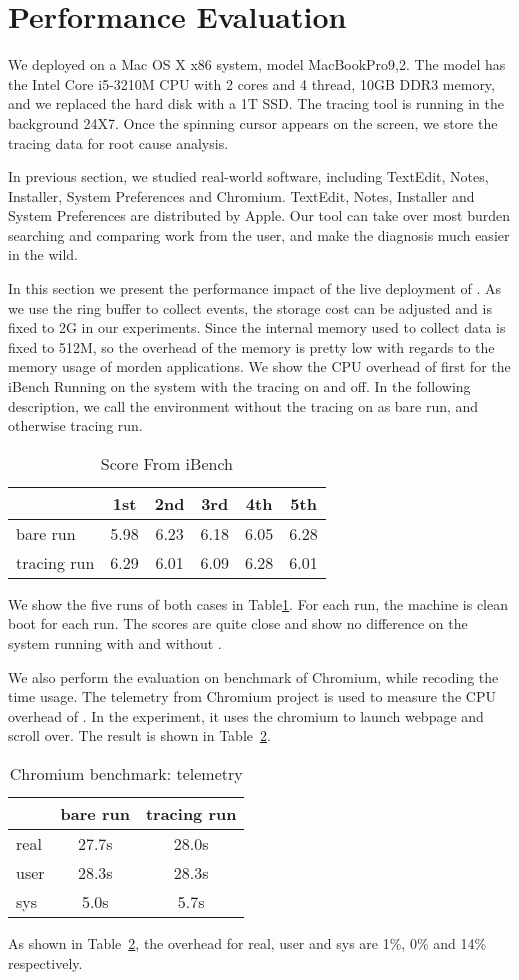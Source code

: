\section{Performance Evaluation}
\label{sec:evaluation}
We deployed \xxx on a Mac OS X x86 system, model MacBookPro9,2.  The
model has the Intel Core i5-3210M CPU with 2 cores and 4 thread, 10GB DDR3
memory, and we replaced the hard disk with a 1T SSD. The tracing tool is
running in the background 24X7. Once the spinning cursor appears on the
screen, we store the tracing data for root cause analysis.

In previous section, we studied real-world software, including TextEdit,
Notes, Installer, System Preferences and Chromium. TextEdit, Notes, Installer and System
Preferences are distributed by Apple.  
Our tool can take over most burden searching and comparing work from the user,
and make the diagnosis much easier in the wild.

In this section we present the performance impact of the live deployment of \xxx.
As we use the ring buffer to collect events, the storage cost can be adjusted
and is fixed to 2G in our experiments.
Since the internal memory used to collect data is fixed to 512M, so the overhead of the
memory is pretty low with regards to the memory usage of  morden applications.
We show the CPU overhead of \xxx first for the iBench Running on the system with the tracing
on and off. In the following description, we call the environment without the tracing on as
bare run, and otherwise tracing run.

\begin{table}[h]
\begin{tabular}{l|c|c|c|c|c}
\hline
 & 1st & 2nd & 3rd & 4th & 5th\\
\hline
 bare run & 5.98 & 6.23 & 6.18 & 6.05 & 6.28\\
\hline
 tracing run& 6.29 & 6.01 & 6.09 & 6.28 & 6.01\\
\hline
\end{tabular}
\caption{Score From iBench}
\label{tab:ibench}
\end{table}
We show the five runs of both cases in Table\ref{tab:ibench}.
For each run, the machine is clean boot for each run.
The scores are quite close and show no difference on the system running with and without \xxx.

We also perform the evaluation on benchmark of Chromium, while recoding the time usage.
The telemetry from Chromium project is used to measure the CPU overhead of \xxx.
In the experiment, it uses the chromium to launch webpage and scroll over.
The result is shown in Table~\ref{tab:chromium benchmark}. 
\begin{table}[h]
\begin{tabular}{l|c|c}
\hline
 & bare run & tracing run \\
\hline
real & 27.7s & 28.0s \\
\hline
user & 28.3s & 28.3s \\
\hline
sys &  5.0s & 5.7s\\
\hline
\end{tabular}
\caption{Chromium benchmark: telemetry}
\label{tab:chromium benchmark}
\end{table}

As shown in Table~\ref{tab:chromium benchmark}, the overhead for real, user and sys are 1\%, 0\% and
14\% respectively.
